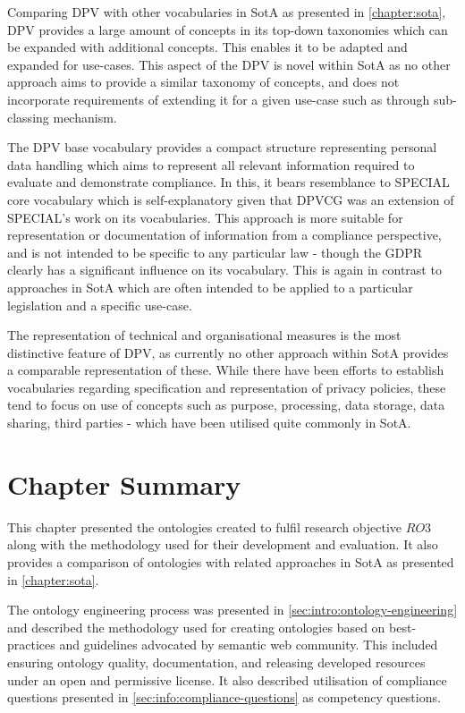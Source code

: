 Comparing DPV with other vocabularies in SotA as presented in \autoref{chapter:sota}, DPV provides a large amount of concepts in its top-down taxonomies which can be expanded with additional concepts. This enables it to be adapted and expanded for use-cases.
This aspect of the DPV is novel within SotA as no other approach aims to provide a similar taxonomy of concepts, and does not incorporate requirements of extending it for a given use-case such as through sub-classing mechanism.

The DPV base vocabulary provides a compact structure representing personal data handling which aims to represent all relevant information required to evaluate and demonstrate compliance.
In this, it bears resemblance to SPECIAL core vocabulary \cite{bonatti_special_2018-2} which is self-explanatory given that DPVCG was an extension of SPECIAL's work on its vocabularies.
This approach is more suitable for representation or documentation of information from a compliance perspective, and is not intended to be specific to any particular law - though the GDPR clearly has a significant influence on its vocabulary.
This is again in contrast to approaches in SotA which are often intended to be applied to a particular legislation and a specific use-case.

The representation of technical and organisational measures is the most distinctive feature of DPV, as currently no other approach within SotA provides a comparable representation of these.
While there have been efforts to establish vocabularies regarding specification and representation of privacy policies, these tend to focus on use of concepts such as purpose, processing, data storage, data sharing, third parties - which have been utilised quite commonly in SotA.

\section*{Chapter Summary}
This chapter presented the ontologies created to fulfil research objective $RO3$ along with the methodology used for their development and evaluation. It also provides a comparison of ontologies with related approaches in SotA as presented in \autoref{chapter:sota}.

The ontology engineering process was presented in \autoref{sec:intro:ontology-engineering} and described the methodology used for creating ontologies based on best-practices and guidelines advocated by semantic web community. This included ensuring ontology quality, documentation, and releasing developed resources under an open and permissive license.
It also described utilisation of compliance questions presented in \autoref{sec:info:compliance-questions} as competency questions.

